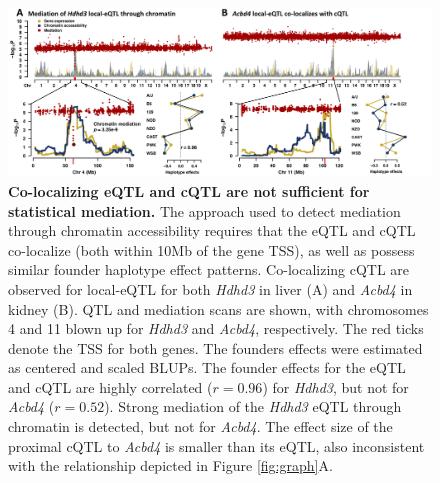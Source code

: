 \documentclass[9pt,twocolumn,twoside]{gsajnl}
\begin{document}
\clearpage

\begin{figure}[hp]
\renewcommand{\familydefault}{\sfdefault}\normalfont
\centering
\includegraphics[width=\textwidth]{figs/mediation_or_colocal.png}
\caption{\textbf{Co-localizing eQTL and cQTL are not sufficient for statistical mediation.} 
The approach used to detect mediation through chromatin accessibility requires that the eQTL and cQTL co-localize (both within 10Mb of the gene TSS), as well as possess similar founder haplotype effect patterns. Co-localizing cQTL are observed for local-eQTL for both \textit{Hdhd3} in liver (A) and \textit{Acbd4} in kidney (B). QTL and mediation scans are shown, with chromosomes 4 and 11 blown up for \textit{Hdhd3} and \textit{Acbd4}, respectively. The red ticks denote the TSS for both genes. The founders effects were estimated as centered and scaled BLUPs. The founder effects for the eQTL and cQTL are highly correlated ($r = 0.96$) for \textit{Hdhd3}, but not for \textit{Acbd4} ($r = 0.52$). Strong mediation of the \textit{Hdhd3} eQTL through chromatin is detected, but not for \textit{Acbd4}. The effect size of the proximal cQTL to \textit{Acbd4} is smaller than its eQTL, also inconsistent with the relationship depicted in Figure \ref{fig:graph}A.
\label{fig:colocalization}}
\end{figure}

\clearpage
\end{document}
